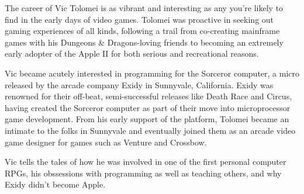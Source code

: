 The career of Vic Tolomei is as vibrant and interesting as any you’re likely to find in the early days of video games. Tolomei was proactive in seeking out gaming experiences of all kinds, following a trail from co-creating mainframe games with his Dungeons \& Dragons-loving friends to becoming an extremely early adopter of the Apple II for both serious and recreational reasons.

Vic became acutely interested in programming for the Sorceror computer, a micro released by the arcade company Exidy in Sunnyvale, California. Exidy was renowned for their off-beat, semi-successful releases like Death Race and Circus, having created the Sorceror computer as part of their move into microprocessor game development. From his early support of the platform, Tolomei became an intimate to the folks in Sunnyvale and eventually joined them as an arcade video game designer for games such as Venture and Crossbow.

Vic tells the tales of how he was involved in one of the first personal computer RPGs, his obssessions with programming as well as teaching others, and why Exidy didn’t become Apple.

\noindent\makebox[\linewidth]{\rule{\paperwidth}{0.4pt}}